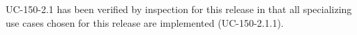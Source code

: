 
UC-150-2.1 has been verified by inspection for this release in that
all specializing use cases chosen for this release are implemented (UC-150-2.1.1).
